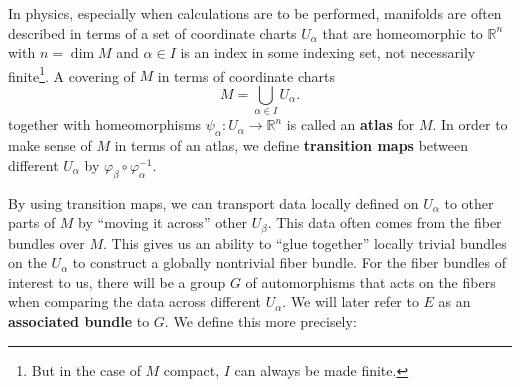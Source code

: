 	
	In physics, especially when calculations are to be performed, manifolds are often described in terms of a set of coordinate charts $U_\alpha$ that are homeomorphic to $\mathbb R^n$ with $n = \dim M$ and $\alpha \in I$ is an index in some indexing set, not necessarily finite\footnote{But in the case of $M$ compact, $I$ can always be made finite.}. A covering of $M$ in terms of coordinate charts 
	\[
		M = \bigcup_{\alpha \in I} U_\alpha.
	\]
	together with homeomorphisms $\psi_\alpha: U_\alpha \to \mathbb R^n$ is called an \textbf{atlas} for $M$. In order to make sense of $M$ in terms of an atlas, we define \textbf{transition maps} between different $U_\alpha$ by $\varphi_\beta \circ \varphi_{\alpha}^{-1}$.
	
	By using transition maps, we can transport data locally defined on $U_{\alpha}$ to other parts of $M$ by ``moving it across'' other $U_\beta$. This data often comes from the fiber bundles over $M$. This gives us an ability to ``glue together'' locally trivial bundles on the $U_\alpha$ to construct a globally nontrivial fiber bundle. For the fiber bundles of interest to us, there will be a group $G$ of automorphisms that acts on the fibers when comparing the data across different $U_\alpha$. We will later refer to $E$ as an \textbf{associated bundle} to $G$.
	We define this more precisely:

